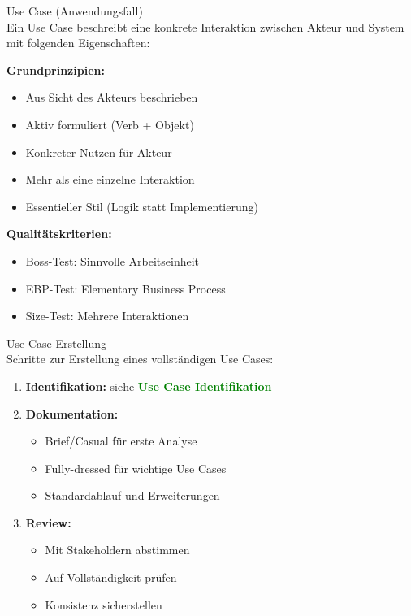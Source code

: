 \begin{definition}{Use Case (Anwendungsfall)}\\
Ein Use Case beschreibt eine konkrete Interaktion zwischen Akteur und System mit folgenden Eigenschaften:

\textbf{Grundprinzipien:}
\begin{itemize}
    \item Aus Sicht des Akteurs beschrieben
    \item Aktiv formuliert (Verb + Objekt)
    \item Konkreter Nutzen für Akteur
    \item Mehr als eine einzelne Interaktion
    \item Essentieller Stil (Logik statt Implementierung)
\end{itemize}

\textbf{Qualitätskriterien:}
\begin{itemize}
    \item Boss-Test: Sinnvolle Arbeitseinheit
    \item EBP-Test: Elementary Business Process
    \item Size-Test: Mehrere Interaktionen
\end{itemize}
\end{definition}

\begin{KR}{Use Case Erstellung}\\
Schritte zur Erstellung eines vollständigen Use Cases:
\begin{enumerate}
    \item \textbf{Identifikation:} siehe \textcolor{green}{\textbf{Use Case Identifikation}}
    \item \textbf{Dokumentation:}
    \begin{itemize}
        \item Brief/Casual für erste Analyse
        \item Fully-dressed für wichtige Use Cases
        \item Standardablauf und Erweiterungen
    \end{itemize}
    \item \textbf{Review:}
    \begin{itemize}
        \item Mit Stakeholdern abstimmen
        \item Auf Vollständigkeit prüfen
        \item Konsistenz sicherstellen
    \end{itemize}
\end{enumerate}
\end{KR}

